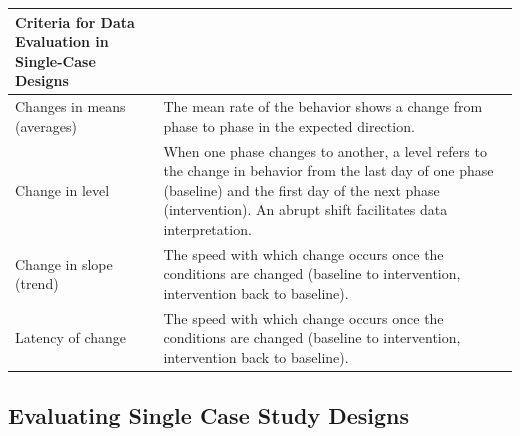 \documentclass[
  english,
]{book}
\begin{document}
\begin{longtable}[]{@{}ll@{}}
\toprule
\begin{minipage}[b]{0.33\columnwidth}\raggedright
Criteria for Data Evaluation in Single-Case Designs\strut
\end{minipage} & \begin{minipage}[b]{0.61\columnwidth}\raggedright
\strut
\end{minipage}\tabularnewline
\midrule
\endhead
\begin{minipage}[t]{0.33\columnwidth}\raggedright
Changes in means (averages)\strut
\end{minipage} & \begin{minipage}[t]{0.61\columnwidth}\raggedright
The mean rate of the behavior shows a change from phase to phase in the expected direction.\strut
\end{minipage}\tabularnewline
\begin{minipage}[t]{0.33\columnwidth}\raggedright
Change in level\strut
\end{minipage} & \begin{minipage}[t]{0.61\columnwidth}\raggedright
When one phase changes to another, a level refers to the change in behavior from the last day of one phase (baseline) and the first day of the next phase (intervention). An abrupt shift facilitates data interpretation.\strut
\end{minipage}\tabularnewline
\begin{minipage}[t]{0.33\columnwidth}\raggedright
Change in slope (trend)\strut
\end{minipage} & \begin{minipage}[t]{0.61\columnwidth}\raggedright
The speed with which change occurs once the conditions are changed (baseline to intervention, intervention back to baseline).\strut
\end{minipage}\tabularnewline
\begin{minipage}[t]{0.33\columnwidth}\raggedright
Latency of change\strut
\end{minipage} & \begin{minipage}[t]{0.61\columnwidth}\raggedright
The speed with which change occurs once the conditions are changed (baseline to intervention, intervention back to baseline).\strut
\end{minipage}\tabularnewline
\bottomrule
\end{longtable}

\hypertarget{evaluating-single-case-study-designs}{%
\subsection{Evaluating Single Case Study Designs}\label{evaluating-single-case-study-designs}}
\end{document}
